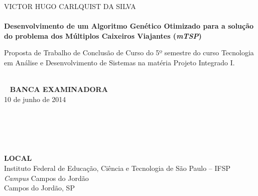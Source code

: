 \documentclass{abnt}
\begin{document}

	\capa
	
	\folhaderosto
	
	\begin{folhadeaprovacao}
	
	\setlength{\ABNTsignthickness}{1pt}
	\begin{center} 
		VICTOR HUGO CARLQUIST DA SILVA \\~\\
		\large{\textbf{Desenvolvimento de um Algoritmo Genético Otimizado para a solução do problema dos Múltiplos Caixeiros Viajantes (\textit{mTSP})}}
	\end{center}
	Proposta de Trabalho de Conclusão de Curso do 5º semestre do curso Tecnologia em Análise e Desenvolvimento de Sistemas na matéria Projeto Integrado I.
	
	\begin{center}
		~\\~
		\textbf{BANCA EXAMINADORA}\\
		10 de junho de 2014\\
	\\
	\\
	\\~\\~\\
	
	
	
	\textbf{LOCAL}\\
	
	Instituto Federal de Educação, Ciência e Tecnologia de São Paulo -- IFSP\\ \textit{Campus} Campos do Jordão \\ Campos do Jordão, SP
	\end{center}
	\end{folhadeaprovacao}
	
\end{document}
